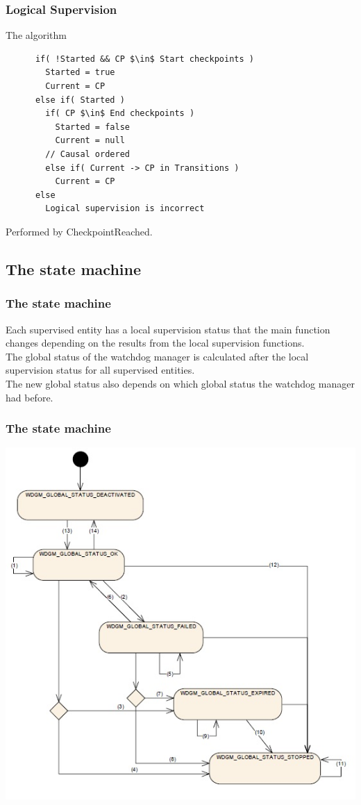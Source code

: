 \documentclass{beamer}
\begin{document}
\begin{frame}[fragile]
  \frametitle{Logical Supervision}
  \begin{block}{The algorithm}
    \begin{lstlisting}
      if( !Started && CP $\in$ Start checkpoints )
        Started = true
        Current = CP
      else if( Started )
        if( CP $\in$ End checkpoints )
          Started = false
          Current = null
        // Causal ordered
        else if( Current -> CP in Transitions )
          Current = CP
      else
        Logical supervision is incorrect
    \end{lstlisting}
  \end{block}
  Performed by CheckpointReached.
\end{frame}

\subsection{The state machine}

\begin{frame}
  \frametitle{The state machine}
  Each supervised entity has a local supervision status that the main
  function changes depending on the results from the local supervision
  functions.\\

  The global status of the watchdog manager is calculated after the
  local supervision status for all supervised entities.\\

  The new global status also depends on which global status the
  watchdog manager had before.
\end{frame}

\begin{frame}
  \frametitle{The state machine}
  \includegraphics[keepaspectratio, width=0.7\linewidth]{globalstatuses}
\end{frame}
\end{document}
